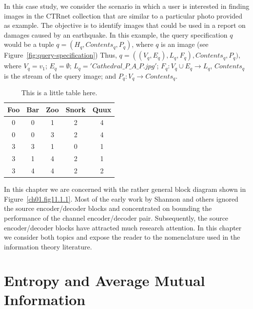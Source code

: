 In this case study, we consider the scenario in which a user is interested in finding images in the CTRnet collection that are similar to a particular photo provided as example. The objective is to identify images that could be used in a report on damages caused by an earthquake. 
In this example, the query specification $q$ would be a tuple $q = (H_q, Contents_q, P_q)$, where $q$ is an image (see Figure~\ref{fig:query-specification})
 Thus, $q =
((V_q, E_q), L_q, F_q), Contents_q, P_q)$, where $V_q = {v_1}$; $E_q =\emptyset$; $L_q={' Cathedral\_P\_A\_P.jpg'}$; $F_q: V_q\cup E_q
\rightarrow L_q$, $Contents_q$ is the stream of the query image; and $P_q: V_q
\rightarrow Contents_q$.

\begin{table}
\caption{This is a little table here.}
\label{tab:coordinates}
\begin{tabular}{ccccc}
\hline
Foo& Bar& Zoo& Snork& Quux\\
\hline
 0 & 0 & 1 & 2 & 4\\
 0 & 0 & 3 & 2 & 4\\
 3 & 3 & 1 & 0 & 1\\
 3 & 1 & 4 & 2 & 1\\
 3 & 4 & 4 & 2 & 2\\
\end{tabular}
\end{table}

In this chapter we are concerned with the rather general block diagram
shown in Figure~\ref{ch01.fig11.1.1}. Most of the early work by
Shannon and others ignored the source  encoder/decoder blocks and
concentrated  on bounding the performance of the channel
encoder/decoder pair. Subsequently, the source  encoder/decoder blocks
have attracted much research attention.  In this chapter we consider
both topics and expose the reader to the nomenclature used in the
information theory literature.

\section{Entropy and Average Mutual Information}
\label{ch01.sec11.2}

